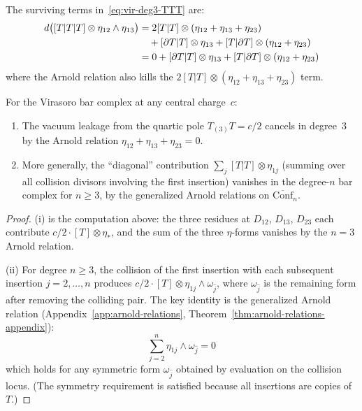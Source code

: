 \begin{computation}
The surviving terms in~\eqref{eq:vir-deg3-TTT} are:
\begin{align}
d\bigl([T|T|T] \otimes \eta_{12}\wedge\eta_{13}\bigr)
&= 2[T|T] \otimes (\eta_{12} + \eta_{13} + \eta_{23}) \notag \\
&\quad + [\partial T|T] \otimes \eta_{13}
+ [T|\partial T] \otimes (\eta_{12} + \eta_{23}) \notag \\
&= 0 + [\partial T|T] \otimes \eta_{13}
+ [T|\partial T] \otimes (\eta_{12} + \eta_{23})
\label{eq:vir-deg3-TTT-simplified}
\end{align}
where the Arnold relation also kills the
$2[T|T] \otimes (\eta_{12}+\eta_{13}+\eta_{23})$ term.
\end{computation}

\begin{proposition}
\label{prop:arnold-virasoro-deg3}
For the Virasoro bar complex at any central charge~$c$:
\begin{enumerate}[label=\textup{(\roman*)}]
\item The vacuum leakage from the quartic pole $T_{(3)}T = c/2$ cancels
in degree~$3$ by the Arnold relation $\eta_{12}+\eta_{13}+\eta_{23} = 0$.
\item More generally, the ``diagonal'' contribution
$\sum_{j} [T|T] \otimes \eta_{1j}$ (summing over all collision divisors
involving the first insertion) vanishes in the degree-$n$ bar complex
for $n \geq 3$, by the generalized Arnold relations on
$\overline{\mathrm{Conf}}_n$.
\end{enumerate}
\end{proposition}

\begin{proof}
(i) is the computation above: the three residues at $D_{12}$, $D_{13}$,
$D_{23}$ each contribute $c/2 \cdot [T] \otimes \eta_{*}$, and the sum
of the three $\eta$-forms vanishes by the $n=3$ Arnold relation.

(ii) For degree $n \geq 3$, the collision of the first insertion with
each subsequent insertion $j = 2, \ldots, n$ produces
$c/2 \cdot [T] \otimes \eta_{1j} \wedge \omega_{\hat{j}}$, where
$\omega_{\hat{j}}$ is the remaining form after removing the colliding
pair.  The key identity is the generalized Arnold relation
(Appendix~\ref{app:arnold-relations}, Theorem~\ref{thm:arnold-relations-appendix}):
\[
\sum_{j=2}^{n} \eta_{1j} \wedge \omega_{\hat{j}} = 0
\]
which holds for any symmetric form $\omega_{\hat{j}}$ obtained by
evaluation on the collision locus.  (The symmetry requirement is
satisfied because all insertions are copies of $T$.)
\end{proof}


